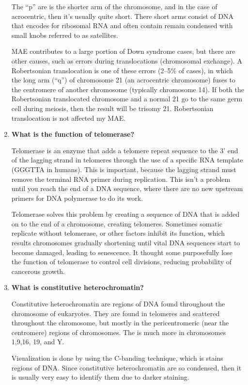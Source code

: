\documentclass[plain,basic]{inVerba-notes}
\begin{document}
\begin{enumerate}
    The ``p'' are is the shorter arm of the chromosome, and in the case of acrocentric, then it's usually quite short. There short arms consist of DNA that encodes for ribosomal RNA and often contain remain condensed with small knobs referred to as satellites.

    MAE contributes to a large portion of Down syndrome cases, but there are other causes, such as errors during translocations (chromosomal exchange). A Robertsonian translocation is one of these errors (2--5\% of cases), in which the long arm (``q'') of chromosome 21 (an acrocentric chromosome) fuses to the centromere of another chromosome (typically chromosome 14). If both the Robertsonian translocated chromosome and a normal 21 go to the same germ cell during meiosis, then the result will be trisomy 21. Robertsonian translocation is not affected my MAE\@.

    \item \textbf{What is the function of telomerase?}
    
    Telomerase is an enzyme that adds a telomere repeat sequence to the 3' end of the lagging  strand in telomeres through the use of a specific RNA template (GGGTTA in humans). This is important, because the lagging strand must remove the terminal RNA primer during replication. This isn't a problem until you reach the end of a DNA sequence, where there are no new upstream primers for DNA polymerase to do its work.

    Telomerase solves this problem by creating a sequence of DNA that is added on to the end of a chromosome, creating telomeres. Sometimes somatic replicate without telomerase, or other factors inhibit its function, which results chromosomes gradually shortening until vital DNA sequences start to become damaged, leading to senescence. It thought some purposefully lose the function of telomerase to control cell divisions, reducing probability of cancerous growth.  

    \item \textbf{What is constitutive heterochromatin?}

    Constitutive heterochromatin are regions of DNA found throughout the chromosome of eukaryotes. They are found in telomeres and scattered throughout the chromosome, but mostly in the pericentromeric (near the centromere) regions of chromosomes. The is much more in chromosomes 1,9,16, 19, and Y. 

    Visualization is done by using the C-banding technique, which is stains regions of DNA\@. Since constitutive heterochromatin are so condensed, then it is usually very easy to identify them due to darker staining.


\end{enumerate}
\end{document}
